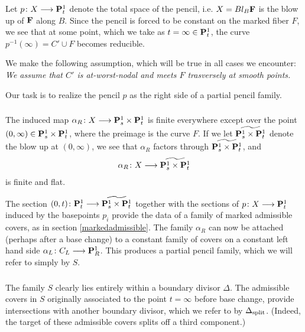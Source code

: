 \documentclass[reqno, 10 pt]{article}
\theoremstyle{definition}
\theoremstyle{remark}
\numberwithin{equation}{section}
\numberwithin{thm}{section}
\numberwithin{prop}{section}
\numberwithin{lem}{section}
\numberwithin{cor}{section}
\numberwithin{conj}{section}
\numberwithin{defn}{section}
\newcommand{\td}{\widetilde}
\newcommand{\F}{{\mathbf F}}
\renewcommand{\to}{\longrightarrow}
\renewcommand{\P}{{\bf P}}
\renewcommand{\F}{{\bf F}}
\newcommand {\from}{{\colon}}
\begin{document}
    Let $p \from X \to \P^1_{t}$ denote the total space of the pencil, i.e. $X = Bl_{B}\F$ is the blow up of $\F$ along $B$.  Since the pencil is forced to be constant on the marked fiber $F$, we see that at some point, which we take as $t = \infty \in \P^1_{t}$, the curve $p^{-1}(\infty) = C' \cup F$ becomes reducible.

    We make the following assumption, which will be true in all cases we encounter: {\sl We assume that $C'$ is at-worst-nodal and meets $F$ trasversely at smooth points.} 

    Our task is to realize the pencil $p$ as the right side of a partial pencil family.

  \subsubsection{}

    The induced map $\alpha_{R} \from X \to \P^{1}_{s} \times \P^{1}_{t}$ is finite everywhere except over the point $(0,\infty) \in \P^{1}_{s} \times \P^{1}_{t}$, where the preimage is  the curve $F$. If we let $\td {\P^1_{s} \times \P^{1}_{t}}$ denote the blow up at $(0, \infty)$, we see that $\alpha_{R}$ factors through $\td {\P^1_{s} \times \P^{1}_{t}}$, and $$\alpha_{R} \from X \to \td {\P^{1}_{s} \times \P^{1}_{t}}$$ is finite and flat. 

    The section $(0,t) \from \P^1_{t} \to  \td {\P^{1}_{s} \times \P^{1}_{t}}$ together with the sections of $p \from X \to \P^1_{t}$  induced by the basepoints $p_{i}$ provide the data of a family of marked admissible covers, as in section \ref{markedadmissible}.  The family $\alpha_{R}$ can now be attached (perhaps after a base change) to a constant family of covers on a constant left hand side $\alpha_{L} \from C_{L} \to \P^{1}_{R}$. This produces a partial pencil family, which we will refer to simply by $S$. 

  \subsubsection{}

    The family $S$ clearly lies entirely within a boundary divisor $\Delta$.  The admissible covers in $S$ originally associated to the point $t=\infty$ before base change, provide intersections with another boundary divisor, which we refer to by $\Delta_{\rm split}$. (Indeed, the target of these admissible covers splits off a third component.)  
\end{document}
